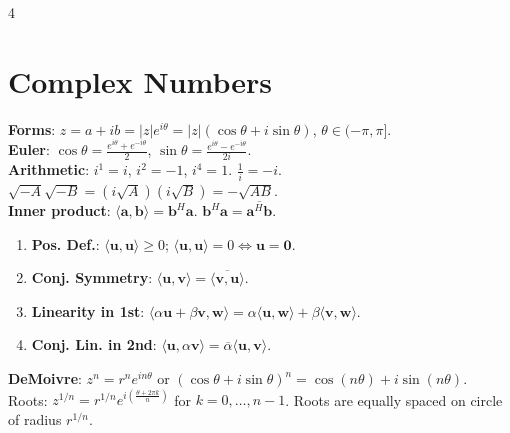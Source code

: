 \documentclass[9pt]{extarticle}
\begin{document}
\begin{multicols*}{4}

\section*{Complex Numbers}
\textbf{Forms}: $z=a+ib=|z|e^{i\theta}=|z|(\cos\theta + i\sin\theta)$, $\theta\in (-\pi,\pi]$.\\
\textbf{Euler}: $\cos\theta = \frac{e^{i\theta} + e^{-i\theta}}{2}$, $\sin\theta = \frac{e^{i\theta} - e^{-i\theta}}{2i}$.\\
\textbf{Arithmetic}: $i^{1}=i$, $i^{2}=-1$, $i^{4}=1$. $\frac{1}{i}=-i$. $\sqrt{-A}\sqrt{-B}=(i\sqrt{A})(i\sqrt{B})=-\sqrt{AB}$.\\
\textbf{Inner product}: $\langle \mathbf{a},\mathbf{b}\rangle=\mathbf{b}^{H}\mathbf{a}$. $\mathbf{b}^{H}\mathbf{a}=\overline{\mathbf{a}^{H}\mathbf{b}}$.
\begin{enumerate}[leftmargin=*, nosep]
    \item \textbf{Pos. Def.}: $\langle \mathbf{u},\mathbf{u} \rangle \ge 0$; $\langle \mathbf{u},\mathbf{u} \rangle = 0 \Leftrightarrow \mathbf{u}=\mathbf{0}$.
    \item \textbf{Conj. Symmetry}: $\langle \mathbf{u},\mathbf{v} \rangle = \overline{\langle \mathbf{v},\mathbf{u} \rangle}$.
    \item \textbf{Linearity in 1st}: $\langle \alpha \mathbf{u} + \beta \mathbf{v}, \mathbf{w} \rangle = \alpha\langle \mathbf{u},\mathbf{w} \rangle + \beta\langle \mathbf{v},\mathbf{w} \rangle$.
    \item \textbf{Conj. Lin. in 2nd}: $\langle \mathbf{u}, \alpha \mathbf{v} \rangle = \overline{\alpha}\langle \mathbf{u},\mathbf{v} \rangle$.
\end{enumerate}
\textbf{DeMoivre}: $z^{n}=r^{n}e^{in\theta}$ or $(\cos\theta + i\sin\theta)^n=\cos(n\theta) + i\sin(n\theta)$.\\
Roots: $z^{1/n}=r^{1/n}e^{i(\frac{\theta+2\pi k}{n})}$ for $k=0,\dots,n-1$. Roots are equally spaced on circle of radius $r^{1/n}$.


\end{multicols*}
\end{document}
